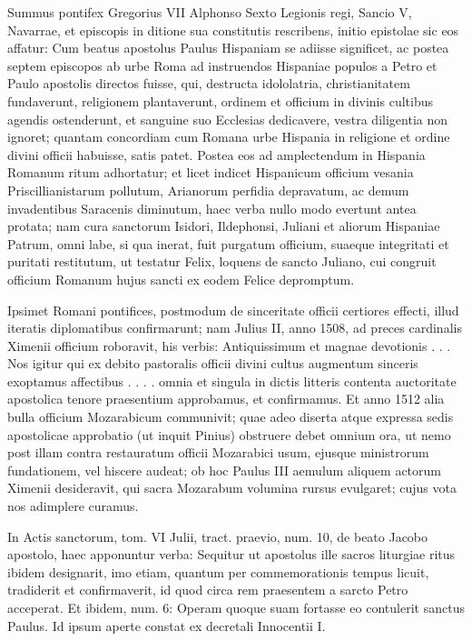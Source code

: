 \documentclass[letter,11pt]{book}
\begin{document}
Summus pontifex Gregorius VII Alphonso Sexto Legionis regi, Sancio V, Navarrae, et episcopis in ditione sua constitutis rescribens, initio epistolae sic eos affatur: Cum beatus apostolus Paulus Hispaniam se adiisse significet, ac postea septem episcopos ab urbe Roma ad instruendos Hispaniae populos a Petro et Paulo apostolis directos fuisse, qui, destructa idololatria, christianitatem fundaverunt, religionem plantaverunt, ordinem et officium in divinis cultibus agendis ostenderunt, et sanguine suo Ecclesias dedicavere, vestra diligentia non ignoret; quantam concordiam cum Romana urbe Hispania in religione et ordine divini officii habuisse, satis patet. Postea eos ad amplectendum in Hispania Romanum ritum adhortatur; et licet indicet Hispanicum officium vesania Priscillianistarum pollutum, Arianorum perfidia depravatum, ac demum invadentibus Saracenis diminutum, haec verba nullo modo evertunt antea protata; nam cura sanctorum Isidori, Ildephonsi, Juliani et aliorum Hispaniae Patrum, omni labe, si qua inerat, fuit purgatum officium, suaeque integritati et puritati restitutum, ut testatur Felix, loquens de sancto Juliano, cui congruit officium Romanum hujus sancti ex eodem Felice depromptum.

 Ipsimet Romani pontifices, postmodum de sinceritate officii certiores effecti, illud iteratis diplomatibus confirmarunt; nam Julius II, anno 1508, ad preces cardinalis Ximenii officium roboravit, his verbis: Antiquissimum et magnae devotionis . . . Nos igitur qui ex debito pastoralis officii divini cultus augmentum sinceris exoptamus affectibus . . . . omnia et singula in dictis litteris contenta auctoritate apostolica tenore praesentium approbamus, et confirmamus. Et anno 1512 alia bulla officium Mozarabicum communivit; quae adeo diserta atque expressa sedis apostolicae approbatio (ut inquit Pinius) obstruere debet omnium ora, ut nemo post illam contra restauratum officii Mozarabici usum, ejusque ministrorum fundationem, vel hiscere audeat; ob hoc Paulus III aemulum aliquem actorum Ximenii desideravit, qui sacra Mozarabum volumina rursus evulgaret; cujus vota nos adimplere curamus.

In Actis sanctorum, tom. VI Julii, tract. praevio, num. 10, de beato Jacobo apostolo, haec apponuntur verba: Sequitur ut apostolus ille sacros liturgiae ritus ibidem designarit, imo etiam, quantum per commemorationis tempus licuit, tradiderit et confirmaverit, id quod circa rem praesentem a sarcto Petro acceperat. Et ibidem, num. 6: Operam quoque suam fortasse eo contulerit sanctus Paulus. Id ipsum aperte constat ex decretali Innocentii I.
\end{document}

